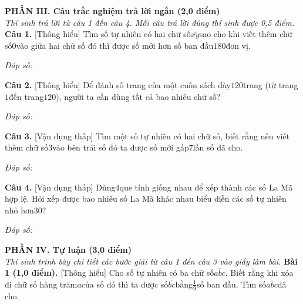 \documentclass[11pt,a4paper]{article}
\begin{document}
\vspace{6pt}
\noindent
\textbf{\large PHẦN III. Câu trắc nghiệm trả lời ngắn (2,0 điểm)}\\
\textit{\small Thí sinh trả lời từ câu 1 đến câu 4. Mỗi câu trả lời đúng thí sinh được 0,5 điểm.}
\vspace{6pt}
\noindent\textbf{Câu 1.} [Thông hiểu] Tìm số tự nhiên có hai chữ số$\overline{xy}$sao cho khi viết thêm chữ số$0$vào giữa hai chữ số đó thì được số mới hơn số ban đầu$180$đơn vị.\par\vspace{2pt}
\noindent\textit{Đáp số:} \dotfill\par\vspace{6pt}

\noindent\textbf{Câu 2.} [Thông hiểu] Để đánh số trang của một cuốn sách dày$120$trang (từ trang$1$đến trang$120$), người ta cần dùng tất cả bao nhiêu chữ số?\par\vspace{2pt}
\noindent\textit{Đáp số:} \dotfill\par\vspace{6pt}

\noindent\textbf{Câu 3.} [Vận dụng thấp] Tìm một số tự nhiên có hai chữ số, biết rằng nếu viết thêm chữ số$3$vào bên trái số đó ta được số mới gấp$7$lần số đã cho.\par\vspace{2pt}
\noindent\textit{Đáp số:} \dotfill\par\vspace{6pt}

\noindent\textbf{Câu 4.} [Vận dụng thấp] Dùng$4$que tính giống nhau để xếp thành các số La Mã hợp lệ. Hỏi xếp được bao nhiêu số La Mã khác nhau biểu diễn các số tự nhiên nhỏ hơn$30$?\par\vspace{2pt}
\noindent\textit{Đáp số:} \dotfill\par\vspace{6pt}


\vspace{6pt}
\noindent
\textbf{\large PHẦN IV. Tự luận (3,0 điểm)}\\
\textit{\small Thí sinh trình bày chi tiết các bước giải từ câu 1 đến câu 3 vào giấy làm bài.}
\vspace{6pt}
\noindent\textbf{Bài 1 (1,0 điểm).} [Thông hiểu] Cho số tự nhiên có ba chữ số$\overline{abc}$. Biết rằng khi xóa đi chữ số hàng trăm$a$của số đó thì ta được số$\overline{bc}$bằng$\frac{1}{9}$số ban đầu. Tìm số$\overline{abc}$đã cho.\par\vspace{8pt}
\end{document}
